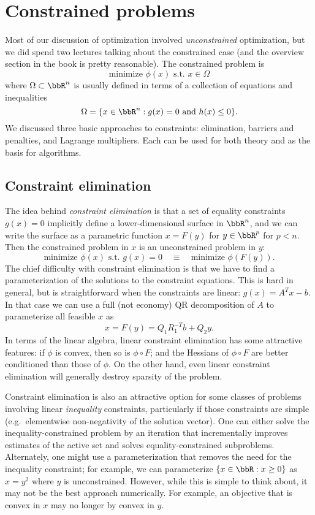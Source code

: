 \documentclass[12pt, leqno]{article}
\begin{document}
\newpage
\section{Constrained problems}

Most of our discussion of optimization involved {\em unconstrained}
optimization, but we did spend two lectures talking about the
constrained case (and the overview section in the book is pretty
reasonable).  The constrained problem is
\[
  \mbox{minimize } \phi(x) \mbox{ s.t.~} x \in \Omega
\]
where $\Omega \subset \bbR^n$ is usually defined in terms of a
collection of equations and inequalities
\[
  \Omega = \{ x \in \bbR^n : g(x) = 0 \mbox{ and } h(x) \leq 0 \}.
\]
We discussed three basic approaches to constraints: elimination,
barriers and penalties, and Lagrange multipliers.  Each can be
used for both theory and as the basis for algorithms.

\subsection{Constraint elimination}

The idea behind {\em constraint elimination} is that a set of equality
constraints $g(x) = 0$ implicitly define a lower-dimensional surface
in $\bbR^n$, and we can write the surface as a parametric function
$x = F(y)$ for $y \in \bbR^p$ for $p < n$.
Then the constrained problem in $x$ is an unconstrained problem in $y$:
\[
  \mbox{minimize } \phi(x) \mbox{ s.t.~} g(x) = 0 \quad \equiv \quad
  \mbox{minimize } \phi(F(y)).
\]
The chief difficulty with constraint elimination is that we have to
find a parameterization of the solutions to the constraint equations.
This is hard in general, but is straightforward when the constraints
are linear: $g(x) = A^T x - b$.  In that case we can use a full (not
economy) QR decomposition of $A$ to parameterize all feasible $x$ as
\[
  x = F(y) = Q_1 R_1^{-T} b + Q_2 y.
\]
In terms of the linear algebra, linear constraint elimination has
some attractive features: if $\phi$ is convex, then so is
$\phi \circ F$; and the Hessians of $\phi \circ F$ are better
conditioned than those of $\phi$.  On the other hand, even linear
constraint elimination will generally destroy sparsity of the problem.
  
Constraint elimination is also an attractive option for some classes
of problems involving linear {\em inequality} constraints,
particularly if those constraints are simple (e.g.~elementwise
non-negativity of the solution vector).  One can either solve
the inequality-constrained problem by an iteration that incrementally
improves estimates of the active set and solves equality-constrained
subproblems.  Alternately, one might use a parameterization that
removes the need for the inequality constraint; for example, we
can parameterize $\{ x \in \bbR : x \geq 0 \}$ as $x = y^2$ where
$y$ is unconstrained.  However, while this is simple to think about,
it may not be the best approach numerically.  For example, an
objective that is convex in $x$ may no longer by convex in $y$.
\end{document}
